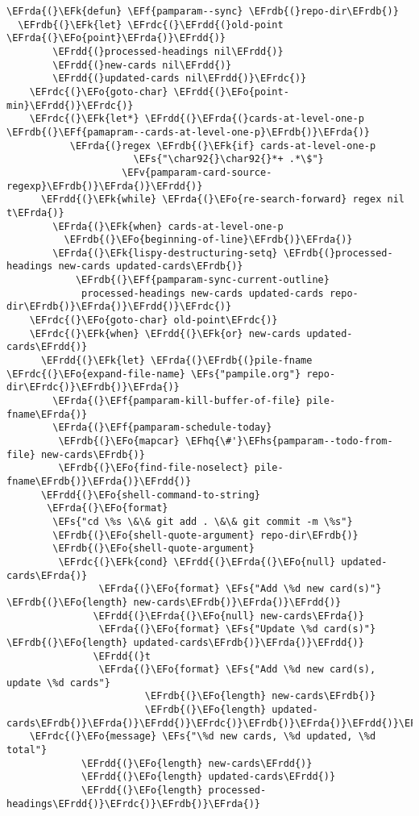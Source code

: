 \documentclass[a4wide,10pt]{article}
\newcommand{\EFs}[1]{\textcolor{EFs}{#1}} %
\newcommand{\EFk}[1]{\textcolor{EFk}{#1}} %
\newcommand{\EFf}[1]{\textcolor{EFf}{#1}} %
\newcommand{\EFv}[1]{\textcolor{EFv}{#1}} %
\newcommand{\EFo}[1]{\textcolor{EFo}{#1}} %
\newcommand{\EFhq}[1]{\textcolor{EFhq}{#1}} %
\newcommand{\EFhs}[1]{\textcolor{EFhs}{#1}} %
\newcommand{\EFrda}[1]{\textcolor{EFrda}{#1}} %
\newcommand{\EFrdb}[1]{\textcolor{EFrdb}{#1}} %
\newcommand{\EFrdc}[1]{\textcolor{EFrdc}{#1}} %
\newcommand{\EFrdd}[1]{\textcolor{EFrdd}{#1}} %
\begin{document}
\begin{Code}
\begin{Verbatim}
\EFrda{(}\EFk{defun} \EFf{pamparam--sync} \EFrdb{(}repo-dir\EFrdb{)}
  \EFrdb{(}\EFk{let} \EFrdc{(}\EFrdd{(}old-point \EFrda{(}\EFo{point}\EFrda{)}\EFrdd{)}
        \EFrdd{(}processed-headings nil\EFrdd{)}
        \EFrdd{(}new-cards nil\EFrdd{)}
        \EFrdd{(}updated-cards nil\EFrdd{)}\EFrdc{)}
    \EFrdc{(}\EFo{goto-char} \EFrdd{(}\EFo{point-min}\EFrdd{)}\EFrdc{)}
    \EFrdc{(}\EFk{let*} \EFrdd{(}\EFrda{(}cards-at-level-one-p \EFrdb{(}\EFf{pamapram--cards-at-level-one-p}\EFrdb{)}\EFrda{)}
           \EFrda{(}regex \EFrdb{(}\EFk{if} cards-at-level-one-p
                      \EFs{"\char92{}\char92{}*+ .*\$"}
                    \EFv{pamparam-card-source-regexp}\EFrdb{)}\EFrda{)}\EFrdd{)}
      \EFrdd{(}\EFk{while} \EFrda{(}\EFo{re-search-forward} regex nil t\EFrda{)}
        \EFrda{(}\EFk{when} cards-at-level-one-p
          \EFrdb{(}\EFo{beginning-of-line}\EFrdb{)}\EFrda{)}
        \EFrda{(}\EFk{lispy-destructuring-setq} \EFrdb{(}processed-headings new-cards updated-cards\EFrdb{)}
            \EFrdb{(}\EFf{pamparam-sync-current-outline}
             processed-headings new-cards updated-cards repo-dir\EFrdb{)}\EFrda{)}\EFrdd{)}\EFrdc{)}
    \EFrdc{(}\EFo{goto-char} old-point\EFrdc{)}
    \EFrdc{(}\EFk{when} \EFrdd{(}\EFk{or} new-cards updated-cards\EFrdd{)}
      \EFrdd{(}\EFk{let} \EFrda{(}\EFrdb{(}pile-fname \EFrdc{(}\EFo{expand-file-name} \EFs{"pampile.org"} repo-dir\EFrdc{)}\EFrdb{)}\EFrda{)}
        \EFrda{(}\EFf{pamparam-kill-buffer-of-file} pile-fname\EFrda{)}
        \EFrda{(}\EFf{pamparam-schedule-today}
         \EFrdb{(}\EFo{mapcar} \EFhq{\#'}\EFhs{pamparam--todo-from-file} new-cards\EFrdb{)}
         \EFrdb{(}\EFo{find-file-noselect} pile-fname\EFrdb{)}\EFrda{)}\EFrdd{)}
      \EFrdd{(}\EFo{shell-command-to-string}
       \EFrda{(}\EFo{format}
        \EFs{"cd \%s \&\& git add . \&\& git commit -m \%s"}
        \EFrdb{(}\EFo{shell-quote-argument} repo-dir\EFrdb{)}
        \EFrdb{(}\EFo{shell-quote-argument}
         \EFrdc{(}\EFk{cond} \EFrdd{(}\EFrda{(}\EFo{null} updated-cards\EFrda{)}
                \EFrda{(}\EFo{format} \EFs{"Add \%d new card(s)"} \EFrdb{(}\EFo{length} new-cards\EFrdb{)}\EFrda{)}\EFrdd{)}
               \EFrdd{(}\EFrda{(}\EFo{null} new-cards\EFrda{)}
                \EFrda{(}\EFo{format} \EFs{"Update \%d card(s)"} \EFrdb{(}\EFo{length} updated-cards\EFrdb{)}\EFrda{)}\EFrdd{)}
               \EFrdd{(}t
                \EFrda{(}\EFo{format} \EFs{"Add \%d new card(s), update \%d cards"}
                        \EFrdb{(}\EFo{length} new-cards\EFrdb{)}
                        \EFrdb{(}\EFo{length} updated-cards\EFrdb{)}\EFrda{)}\EFrdd{)}\EFrdc{)}\EFrdb{)}\EFrda{)}\EFrdd{)}\EFrdc{)}
    \EFrdc{(}\EFo{message} \EFs{"\%d new cards, \%d updated, \%d total"}
             \EFrdd{(}\EFo{length} new-cards\EFrdd{)}
             \EFrdd{(}\EFo{length} updated-cards\EFrdd{)}
             \EFrdd{(}\EFo{length} processed-headings\EFrdd{)}\EFrdc{)}\EFrdb{)}\EFrda{)}


\end{Verbatim}
\end{Code}
\end{document}
